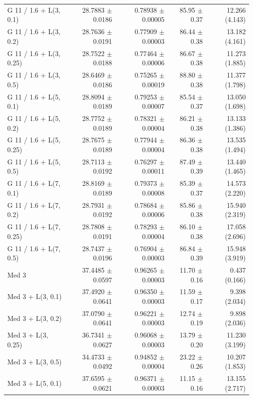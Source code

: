 \begin{longtable}{lrrrr}
G 11 / 1.6 + L(3, 0.1) & 28.7883 $\pm$ 0.0186 & 0.78938 $\pm$ 0.00005 & 85.95 $\pm$ 0.37 & 12.266 (4.143) \\
G 11 / 1.6 + L(3, 0.2) & 28.7636 $\pm$ 0.0191 & 0.77909 $\pm$ 0.00003 & 86.44 $\pm$ 0.38 & 13.182 (4.161) \\
G 11 / 1.6 + L(3, 0.25) & 28.7522 $\pm$ 0.0188 & 0.77464 $\pm$ 0.00006 & 86.67 $\pm$ 0.38 & 11.273 (1.885) \\
G 11 / 1.6 + L(3, 0.5) & 28.6469 $\pm$ 0.0186 & 0.75265 $\pm$ 0.00019 & 88.80 $\pm$ 0.38 & 11.377 (1.798) \\
G 11 / 1.6 + L(5, 0.1) & 28.8094 $\pm$ 0.0189 & 0.79253 $\pm$ 0.00007 & 85.54 $\pm$ 0.37 & 13.050 (1.698) \\
G 11 / 1.6 + L(5, 0.2) & 28.7752 $\pm$ 0.0189 & 0.78321 $\pm$ 0.00004 & 86.21 $\pm$ 0.38 & 13.133 (1.386) \\
G 11 / 1.6 + L(5, 0.25) & 28.7675 $\pm$ 0.0189 & 0.77944 $\pm$ 0.00004 & 86.36 $\pm$ 0.38 & 13.535 (1.494) \\
G 11 / 1.6 + L(5, 0.5) & 28.7113 $\pm$ 0.0192 & 0.76297 $\pm$ 0.00011 & 87.49 $\pm$ 0.39 & 13.440 (1.465) \\
G 11 / 1.6 + L(7, 0.1) & 28.8169 $\pm$ 0.0189 & 0.79373 $\pm$ 0.00008 & 85.39 $\pm$ 0.37 & 14.573 (2.220) \\
G 11 / 1.6 + L(7, 0.2) & 28.7931 $\pm$ 0.0192 & 0.78684 $\pm$ 0.00006 & 85.86 $\pm$ 0.38 & 15.940 (2.319) \\
G 11 / 1.6 + L(7, 0.25) & 28.7808 $\pm$ 0.0191 & 0.78293 $\pm$ 0.00004 & 86.10 $\pm$ 0.38 & 17.058 (2.696) \\
G 11 / 1.6 + L(7, 0.5) & 28.7437 $\pm$ 0.0196 & 0.76904 $\pm$ 0.00003 & 86.84 $\pm$ 0.39 & 15.948 (3.919) \\
Med 3 & 37.4485 $\pm$ 0.0597 & 0.96265 $\pm$ 0.00003 & 11.70 $\pm$ 0.16 & 0.437 (0.166) \\
Med 3 + L(3, 0.1) & 37.4920 $\pm$ 0.0641 & 0.96350 $\pm$ 0.00003 & 11.59 $\pm$ 0.17 & 9.398 (2.034) \\
Med 3 + L(3, 0.2) & 37.0790 $\pm$ 0.0641 & 0.96221 $\pm$ 0.00003 & 12.74 $\pm$ 0.19 & 9.898 (2.036) \\
Med 3 + L(3, 0.25) & 36.7341 $\pm$ 0.0627 & 0.96068 $\pm$ 0.00003 & 13.79 $\pm$ 0.20 & 11.230 (3.199) \\
Med 3 + L(3, 0.5) & 34.4733 $\pm$ 0.0492 & 0.94852 $\pm$ 0.00004 & 23.22 $\pm$ 0.26 & 10.207 (1.853) \\
Med 3 + L(5, 0.1) & 37.6595 $\pm$ 0.0621 & 0.96371 $\pm$ 0.00003 & 11.15 $\pm$ 0.16 & 13.155 (2.717) \\

\end{longtable}

